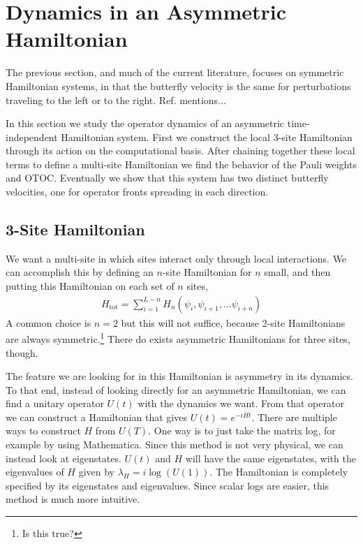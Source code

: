 \section{Dynamics in an Asymmetric Hamiltonian} \label{sec:asymham}

The previous section, and much of the current literature, focuses on symmetric Hamiltonian systems, in that the butterfly velocity is the same for perturbations traveling to the left or to the right. Ref.\cite{??} mentions...

In this section we study the operator dynamics of an asymmetric time-independent Hamiltonian system. First we construct the local 3-site Hamiltonian through its action on the computational basis. 
After chaining together these local terms to define a multi-site Hamiltonian we find the behavior of the Pauli weights and OTOC. Eventually we show that this system has two distinct butterfly velocities, one for operator fronts spreading in each direction.

\subsection{3-Site Hamiltonian}  \label{sub:hamiltonian}

We want a multi-site in which sites interact only through local interactions. We can accomplish this by defining an $n$-site Hamiltonian for $n$ small, and then putting this Hamiltonian on each set of $n$ sites,
\begin{align}
H_{\text{tot}} = \sum_{i=1}^{L-n}H_n(\psi_i,\psi_{i+1},\dots\psi_{i+n})
 \label{eqn:chain}
\end{align}
A common choice is $n=2$ but this will not suffice, because 2-site Hamiltonians are always symmetric.\footnote{Is this true?} There do exists asymmetric Hamiltonians for three sites, though. 

The feature we are looking for in this Hamiltonian is asymmetry in its dynamics. To that end, instead of looking directly for an asymmetric Hamiltonian, we can find a unitary operator $U(t)$ with the dynamics we want. From that operator we can construct a Hamiltonian that gives $U(t)=e^{-iHt}$. There are multiple ways to construct $H$ from $U(T)$. One way is to just take the matrix log, for example by using Mathematica. Since this method is not very physical, we can instead look at eigenstates. $U(t)$ and $H$ will have the same eigenstates, with the eigenvalues of $H$ given by $\lambda_H = i\log(U(1))$. The Hamiltonian is completely specified by its eigenstates and eigenvalues. Since scalar logs are easier, this method is much more intuitive.

